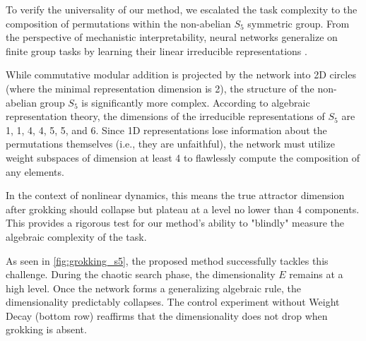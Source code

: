 \documentclass{article}
\begin{document}
To verify the universality of our method, we escalated the task complexity to the composition of permutations within the non-abelian $S_5$ symmetric group. From the perspective of mechanistic interpretability, neural networks generalize on finite group tasks by learning their linear irreducible representations \citep{chughtai2023toy}.

While commutative modular addition is projected by the network into 2D circles (where the minimal representation dimension is 2), the structure of the non-abelian group $S_5$ is significantly more complex. According to algebraic representation theory, the dimensions of the irreducible representations of $S_5$ are 1, 1, 4, 4, 5, 5, and 6. Since 1D representations lose information about the permutations themselves (i.e., they are unfaithful), the network must utilize weight subspaces of dimension at least 4 to flawlessly compute the composition of any elements. 

In the context of nonlinear dynamics, this means the true attractor dimension after grokking should collapse but plateau at a level no lower than 4 components. This provides a rigorous test for our method's ability to "blindly" measure the algebraic complexity of the task.

As seen in \cref{fig:grokking_s5}, the proposed method successfully tackles this challenge. During the chaotic search phase, the dimensionality $E$ remains at a high level. Once the network forms a generalizing algebraic rule, the dimensionality predictably collapses. The control experiment without Weight Decay (bottom row) reaffirms that the dimensionality does not drop when grokking is absent.
\end{document}
